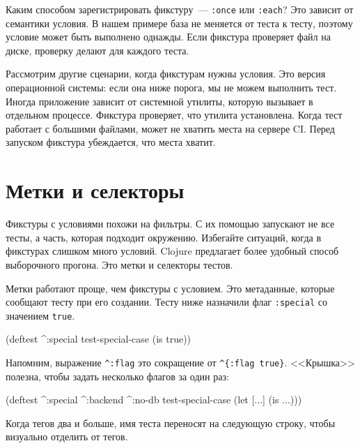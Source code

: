 Каким способом зарегистрировать фикстуру~--- \verb|:once| или \verb|:each|?
Это зависит от семантики условия. В нашем примере база не меняется от теста к
тесту, поэтому условие может быть выполнено однажды. Если фикстура проверяет
файл на диске, проверку делают для каждого теста.

Рассмотрим другие сценарии, когда фикстурам нужны условия. Это версия
операционной системы: если она ниже порога, мы не можем выполнить тест. Иногда
приложение зависит от системной утилиты, которую вызывает в отдельном
процессе. Фикстура проверяет, что утилита установлена. Когда тест работает с
большими файлами, может не хватить места на сервере CI. Перед запуском фикстура
убеждается, что места хватит.

\section{Метки и селекторы}


Фикстуры с условиями похожи на фильтры. С их помощью запускают не все тесты, а
часть, которая подходит окружению. Избегайте ситуаций, когда в фикстурах слишком
много условий. Clojure предлагает более удобный способ выборочного
прогона. Это метки и селекторы тестов.

Метки работают проще, чем фикстуры с условием. Это метаданные, которые сообщают
тесту при его создании. Тесту ниже назначили флаг \verb|:special| со значением
\verb|true|.

\begin{english}
  \begin{clojure}
(deftest ^:special test-special-case
  (is true))
  \end{clojure}
\end{english}


Напомним, выражение \verb|^:flag| это сокращение от \verb|^{:flag true}|.
<<Крышка>> полезна, чтобы задать несколько флагов за один раз:

\begin{english}
  \begin{clojure}
(deftest ^:special ^:backend ^:no-db
  test-special-case
  (let [...]
    (is ...)))
  \end{clojure}
\end{english}

\noindent
Когда тегов два и больше, имя теста переносят на следующую строку, чтобы
визуально отделить от тегов.

